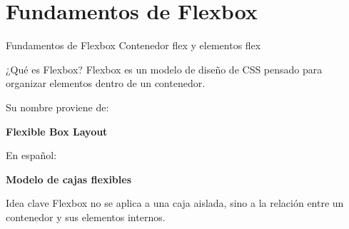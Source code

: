 \documentclass[aspectratio=169,11.5pt]{beamer}
\begin{document}

    \section{Fundamentos de Flexbox}

    \SectionSlide
    {Fundamentos de Flexbox}
    {Contenedor flex y elementos flex}

    \begin{frame}{¿Qué es Flexbox?}
        Flexbox es un modelo de diseño de CSS pensado
        para organizar elementos dentro de un contenedor.

        Su nombre proviene de:

        \begin{center}
            \Large
            \textbf{Flexible Box Layout}
        \end{center}

        En español:

        \begin{center}
            \large
            \textbf{Modelo de cajas flexibles}
        \end{center}

        \begin{block}{Idea clave}
            Flexbox no se aplica a una caja aislada,
            sino a la relación entre un contenedor
            y sus elementos internos.
        \end{block}
    \end{frame}
\end{document}
